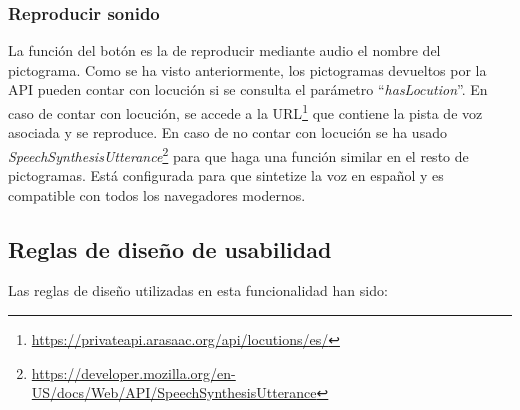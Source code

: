 \subsubsection{Reproducir sonido}


La función del botón es la de reproducir mediante audio el nombre del pictograma. Como se ha visto anteriormente, los pictogramas devueltos por la API pueden contar con locución si se consulta el parámetro “\textit{hasLocution}”. En caso de contar con locución, se accede a la URL\footnote{\url{https://privateapi.arasaac.org/api/locutions/es/}} que contiene la pista de voz asociada y se reproduce. 
En caso de no contar con locución se ha usado \textit{SpeechSynthesisUtterance}\footnote{\url{https://developer.mozilla.org/en-US/docs/Web/API/SpeechSynthesisUtterance}} para que haga una función similar en el resto de pictogramas. Está configurada para que sintetize la voz en español y es compatible con todos los navegadores modernos.

\subsection{Reglas de diseño de usabilidad}
 Las reglas de diseño utilizadas en esta funcionalidad han sido:

